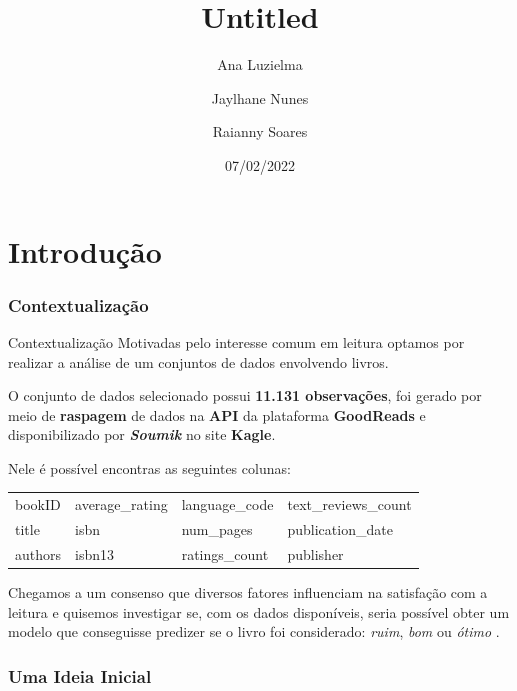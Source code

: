 \documentclass[
  9 pt,
  ignorenonframetext,
]{beamer}
\title{Untitled}
\author{Ana Luzielma \newline \and Jaylhane Nunes \newline \and Raianny
Soares}
\date{07/02/2022}
\begin{document}
\frame{\titlepage}

\hypertarget{introduuxe7uxe3o}{%
\section{Introdução}\label{introduuxe7uxe3o}}

\hypertarget{contextualizauxe7uxe3o}{%
\subsubsection{Contextualização}\label{contextualizauxe7uxe3o}}

\begin{frame}{Contextualização}
Motivadas pelo interesse comum em leitura optamos por realizar a análise
de um conjuntos de dados envolvendo livros.

O conjunto de dados selecionado possui \textbf{11.131 observações}, foi
gerado por meio de \textbf{raspagem} de dados na \textbf{API} da
plataforma \textbf{GoodReads} e disponibilizado por
\textbf{\emph{Soumik}} no site \textbf{Kagle}.

Nele é possível encontras as seguintes colunas:

\begin{table}[H]
\centering
\begin{tabular}{llll}
\toprule
bookID & average\_rating & language\_code & text\_reviews\_count\\
title & isbn & num\_pages & publication\_date\\
authors & isbn13 & ratings\_count & publisher\\
\bottomrule
\end{tabular}
\end{table}

Chegamos a um consenso que diversos fatores influenciam na satisfação
com a leitura e quisemos investigar se, com os dados disponíveis, seria
possível obter um modelo que conseguisse predizer se o livro foi
considerado: \emph{ruim}, \emph{bom} ou \emph{ótimo} .
\end{frame}

\hypertarget{uma-ideia-inicial}{%
\subsubsection{Uma Ideia Inicial}\label{uma-ideia-inicial}}
\end{document}
